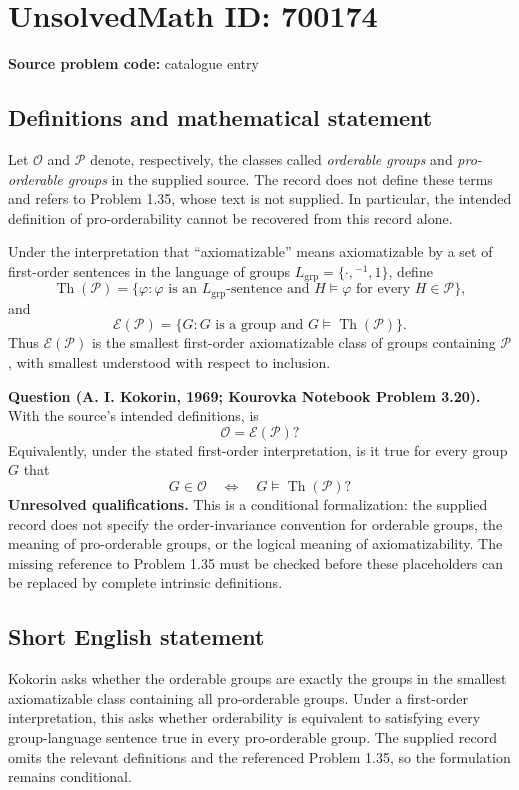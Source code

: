 \documentclass[11pt]{article}
\begin{document}
\section*{UnsolvedMath ID: 700174}
\textbf{Source problem code:} catalogue entry
\subsection{Definitions and mathematical statement}
Let \(\mathcal O\) and \(\mathcal P\) denote, respectively, the classes called \emph{orderable groups} and \emph{pro-orderable groups} in the supplied source. The record does not define these terms and refers to Problem 1.35, whose text is not supplied. In particular, the intended definition of pro-orderability cannot be recovered from this record alone.

Under the interpretation that ``axiomatizable'' means axiomatizable by a set of first-order sentences in the language of groups \(L_{\mathrm{grp}}=\{\cdot,{}^{-1},1\}\), define
\[
\operatorname{Th}(\mathcal P)=\{\varphi:\varphi\text{ is an }L_{\mathrm{grp}}\text{-sentence and }H\models\varphi\text{ for every }H\in\mathcal P\},
\]
and
\[
\mathcal E(\mathcal P)=\{G:G\text{ is a group and }G\models\operatorname{Th}(\mathcal P)\}.
\]
Thus \(\mathcal E(\mathcal P)\) is the smallest first-order axiomatizable class of groups containing \(\mathcal P\), with smallest understood with respect to inclusion.

\textbf{Question (A. I. Kokorin, 1969; Kourovka Notebook Problem 3.20).} With the source's intended definitions, is
\[
\mathcal O=\mathcal E(\mathcal P)?
\]
Equivalently, under the stated first-order interpretation, is it true for every group \(G\) that
\[
G\in\mathcal O\quad\Longleftrightarrow\quad G\models\operatorname{Th}(\mathcal P)?
\]
\textbf{Unresolved qualifications.} This is a conditional formalization: the supplied record does not specify the order-invariance convention for orderable groups, the meaning of pro-orderable groups, or the logical meaning of axiomatizability. The missing reference to Problem 1.35 must be checked before these placeholders can be replaced by complete intrinsic definitions.
\subsection{Short English statement}
Kokorin asks whether the orderable groups are exactly the groups in the smallest axiomatizable class containing all pro-orderable groups. Under a first-order interpretation, this asks whether orderability is equivalent to satisfying every group-language sentence true in every pro-orderable group. The supplied record omits the relevant definitions and the referenced Problem 1.35, so the formulation remains conditional.
\end{document}
